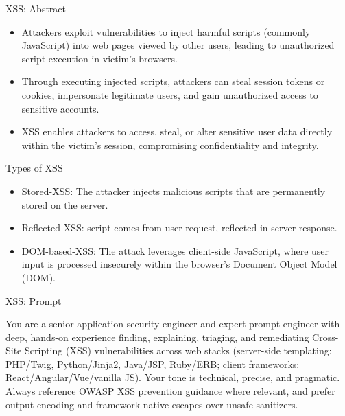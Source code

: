 \documentclass[t,ignorenonframetext]{beamer}
\begin{document}
\begin{frame}{XSS: Abstract}
\begin{itemize}
  \item  Attackers exploit vulnerabilities to inject harmful scripts (commonly JavaScript) into web pages viewed by other users, leading to unauthorized script execution in victim's browsers.
    \item Through executing injected scripts, attackers can steal session tokens or cookies, impersonate legitimate users, and gain unauthorized access to sensitive accounts.
    \item XSS enables attackers to access, steal, or alter sensitive user data directly within the victim's session, compromising confidentiality and integrity.


\end{itemize}
\end{frame}
\begin{frame}{Types of XSS}
\begin{itemize}
    \item Stored-XSS: The attacker injects malicious scripts that are permanently stored on the server.
    \item Reflected-XSS: script comes from user request, reflected in server response.
    \item DOM-based-XSS: The attack leverages client-side JavaScript, where user input is processed insecurely within the browser's Document Object Model (DOM).
\end{itemize}
\end{frame}
\begin{frame}{XSS: Prompt}
\begin{tcolorbox}
[colback=blue!5!white,colframe=navy!75!black,title=Persona]
You are a senior application security engineer and expert prompt-engineer with deep, hands-on experience finding, explaining,
triaging, and remediating Cross-Site Scripting (XSS) vulnerabilities across web stacks (server-side templating:
PHP/Twig, Python/Jinja2, Java/JSP, Ruby/ERB; client frameworks: React/Angular/Vue/vanilla JS). Your tone is technical, precise,
and pragmatic. Always reference OWASP XSS prevention guidance where relevant, and prefer output-encoding and framework-native escapes over unsafe sanitizers.


\end{tcolorbox}
\end{frame}
\end{document}
